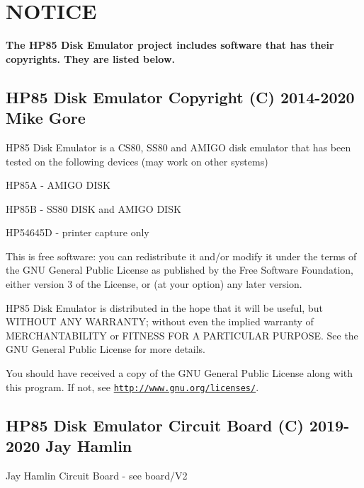 \hypertarget{index_COPYRIGHT}{}\section{N\+O\+T\+I\+CE}\label{index_COPYRIGHT}
{\bfseries The H\+P85 Disk Emulator project includes software that has their copyrights. They are listed below.}





\subsection*{H\+P85 Disk Emulator Copyright (C) 2014-\/2020 Mike Gore}

H\+P85 Disk Emulator is a C\+S80, S\+S80 and A\+M\+I\+GO disk emulator that has been tested on the following devices (may work on other systems)
\begin{DoxyItemize}
\item H\+P85A -\/ A\+M\+I\+GO D\+I\+SK
\item H\+P85B -\/ S\+S80 D\+I\+SK and A\+M\+I\+GO D\+I\+SK
\item H\+P54645D -\/ printer capture only
\end{DoxyItemize}

This is free software\+: you can redistribute it and/or modify it under the terms of the G\+NU General Public License as published by the Free Software Foundation, either version 3 of the License, or (at your option) any later version.

H\+P85 Disk Emulator is distributed in the hope that it will be useful, but W\+I\+T\+H\+O\+UT A\+NY W\+A\+R\+R\+A\+N\+TY; without even the implied warranty of M\+E\+R\+C\+H\+A\+N\+T\+A\+B\+I\+L\+I\+TY or F\+I\+T\+N\+E\+SS F\+OR A P\+A\+R\+T\+I\+C\+U\+L\+AR P\+U\+R\+P\+O\+SE. See the G\+NU General Public License for more details.

You should have received a copy of the G\+NU General Public License along with this program. If not, see \href{http://www.gnu.org/licenses/}{\tt http\+://www.\+gnu.\+org/licenses/}.



 \subsection*{H\+P85 Disk Emulator Circuit Board (C) 2019-\/2020 Jay Hamlin}


\begin{DoxyItemize}
\item Jay Hamlin Circuit Board -\/ see board/\+V2 


\end{DoxyItemize}

